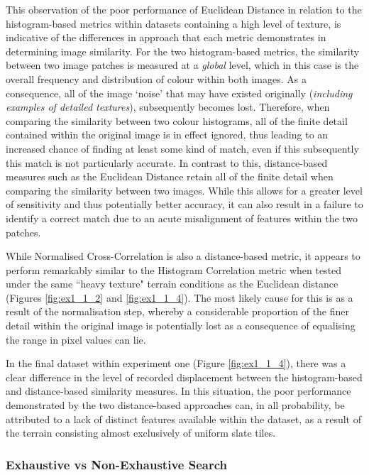 This observation of the poor performance of Euclidean Distance in relation to the histogram-based metrics within datasets containing a high level of texture, is indicative of the differences in approach that each metric demonstrates in determining image similarity. For the two histogram-based metrics, the similarity between two image patches is measured at a \textit{global} level, which in this case is the overall frequency and distribution of colour within both images. As a consequence, all of the image `noise' that may have existed originally (\textit{including examples of detailed textures}), subsequently becomes lost. Therefore, when comparing the similarity between two colour histograms, all of the finite detail contained within the original image is in effect ignored, thus leading to an increased chance of finding at least some kind of match, even if this subsequently this match is not particularly accurate. In contrast to this, distance-based measures such as the Euclidean Distance retain all of the finite detail when comparing the similarity between two images. While this allows for a greater level of sensitivity and thus potentially better accuracy, it can also result in a failure to identify a correct match due to an acute misalignment of features within the two patches.

While Normalised Cross-Correlation is also a distance-based metric, it appears to perform remarkably similar to the Histogram Correlation metric when tested under the same ``heavy texture" terrain conditions as the Euclidean distance (Figures \ref{fig:ex1_1_2} and \ref{fig:ex1_1_4}). The most likely cause for this is as a result of the normalisation step, whereby a considerable proportion of the finer detail within the original image is potentially lost as a consequence of equalising the range in pixel values can lie. 

In the final dataset within experiment one (Figure \ref{fig:ex1_1_4}), there was a clear difference in the level of recorded displacement between the histogram-based and distance-based similarity measures. In this situation, the poor performance demonstrated by the two distance-based approaches can, in all probability, be attributed to a lack of distinct features available within the dataset, as a result of the terrain consisting almost exclusively of uniform slate tiles.

\subsubsection{Exhaustive vs Non-Exhaustive Search}

